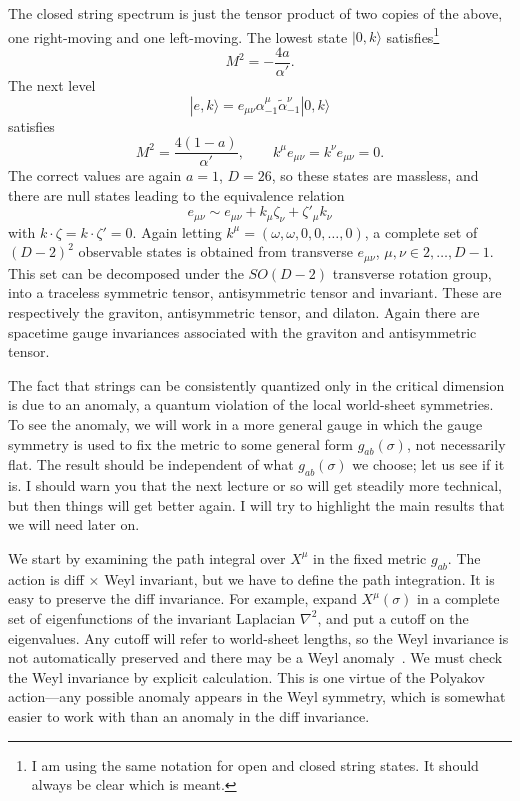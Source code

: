 The closed string spectrum is just the tensor product of two copies
of the above, one right-moving and one left-moving.  The lowest
state $|0,k\rangle$ satisfies\footnote {I am using the same
notation for open and closed string states. It should always be
clear which is meant.}
\begin{equation}
M^2 = -\frac{4a}{\alpha'}. 
\end{equation}
The next level
\begin{equation}
|e,k\rangle = e_{\mu\nu} \alpha^\mu_{-1} \tilde\alpha^\nu_{-1}
|0,k\rangle
\end{equation}
satisfies 
\begin{equation}
M^2 = \frac{4(1-a)}{\alpha'}, \qquad k^\mu e_{\mu\nu} = k^\nu
e_{\mu\nu} = 0. \label{ctens}
\end{equation}
The correct values are again $a=1$, $D=26$, so these states are
massless, and there are null states leading to the equivalence
relation
\begin{equation}
e_{\mu\nu} \sim e_{\mu\nu} + k_\mu \zeta_\nu + \zeta'_\mu k_\nu
\end{equation}
with $k \cdot \zeta = k \cdot \zeta' = 0$.  Again letting
$k^\mu = (\omega,\omega,0,0,\ldots,0)$, a complete set of
$(D-2)^2$ observable states is obtained from transverse
$e_{\mu\nu}$, $\mu,\nu \in 2, \ldots, D-1$.  This set can be
decomposed under the $SO(D-2)$ transverse rotation group,
into a traceless symmetric tensor, antisymmetric tensor and
invariant.  These are respectively the graviton, antisymmetric
tensor, and dilaton.  Again there are spacetime gauge invariances
associated with the graviton and antisymmetric tensor.


The fact that strings can be consistently quantized only in the
critical dimension is due to an anomaly, a quantum violation of
the local world-sheet symmetries.
To see the anomaly, we will work in a more general gauge
in which the gauge symmetry is used to fix the
metric to some general form $ g_{ab}(\sigma)$, not necessarily
flat.  The result should be independent of what
$ g_{ab}(\sigma)$ we choose; let us see if it is. I should warn
you that the next lecture or so will get steadily more
technical, but then things will get better again.  I will try to
highlight the main results that we will need later on.

We start by examining the path integral over $X^\mu$ in the
fixed metric $ g_{ab}$.  The action is diff $\times$
Weyl invariant, but we have to define the path integration.
It is easy to preserve the diff invariance.  For example, expand
$X^\mu(\sigma)$ in a complete set of eigenfunctions of
the invariant Laplacian $\nabla^2$, and put a cutoff on the
eigenvalues.  Any cutoff will refer to
world-sheet lengths, so the Weyl invariance is not automatically
preserved and there may be a Weyl anomaly~\cite{CD,Poly1}. 
We must check the Weyl invariance by
explicit calculation.  This is one
virtue of the Polyakov action---any possible anomaly appears in
the Weyl symmetry, which is somewhat easier to work with than an
anomaly in the diff invariance.

